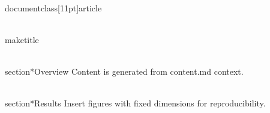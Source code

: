 \\documentclass[11pt]{article}
\begin{document}
\\maketitle

\\section*{Overview}
Content is generated from content.md context.

\\section*{Results}
Insert figures with fixed dimensions for reproducibility.

\
\end{document}
